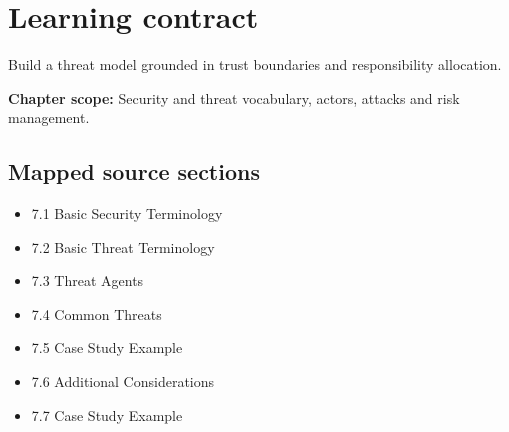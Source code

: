 \documentclass[10pt,letterpaper]{article}
\begin{document}
\sourceStatement
\tableofcontents
\newpage
\section{Learning contract}
\begin{takeaway}
Build a threat model grounded in trust boundaries and responsibility allocation.
\end{takeaway}
\textbf{Chapter scope:} Security and threat vocabulary, actors, attacks and risk management.\\
\subsection{Mapped source sections}
\begin{itemize}
\item 7.1 Basic Security Terminology
\item 7.2 Basic Threat Terminology
\item 7.3 Threat Agents
\item 7.4 Common Threats
\item 7.5 Case Study Example
\item 7.6 Additional Considerations
\item 7.7 Case Study Example
\end{itemize}
\end{document}
